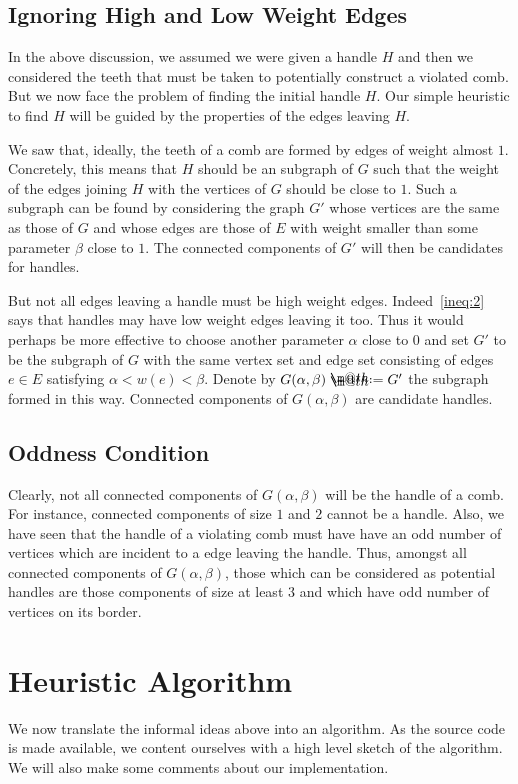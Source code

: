 \documentclass[12pt, letterpaper]{amsart}
\makeatletter
\theoremstyle{plain}
\theoremstyle{definition}
\theoremstyle{remark}
\newcommand*{\coloneqq}{\mathrel{\rlap{%
           \raisebox{0.3ex}{$\m@th\cdot$}}%
           \raisebox{-0.3ex}{$\m@th\cdot$}}%
           =}
\makeatother
\begin{document}
\subsection{Ignoring High and Low Weight Edges}
In the above discussion, we assumed we were given a handle $H$ and then we
considered the teeth that must be taken to potentially construct a violated
comb.  But we now face the problem of finding the initial handle $H$. Our
simple heuristic to find $H$ will be guided by the properties of the edges
leaving $H$.

We saw that, ideally, the teeth of a comb are formed by edges of weight almost
$1$. Concretely, this means that $H$ should be an subgraph of $G$ such
that the weight of the edges joining $H$ with the vertices of $G$ should be
close to $1$. Such a subgraph can be found by considering the graph $G'$ whose
vertices are the same as those of $G$ and whose edges are those of $E$ with
weight smaller than some parameter $\beta$ close to $1$. The connected
components of $G'$ will then be candidates for handles.

But not all edges leaving a handle must be high weight edges.
Indeed~\eqref{ineq:2} says that handles may have low weight edges leaving it
too. Thus it would perhaps be more effective to choose another parameter
$\alpha$ close to $0$ and set $G'$ to be the subgraph of $G$ with the same
vertex set and edge set consisting of edges $e \in E$ satisfying $\alpha < w(e)
< \beta$. Denote by $G(\alpha,\beta) \coloneqq G'$ the subgraph formed in this
way. Connected components of $G(\alpha,\beta)$ are candidate handles.

\subsection{Oddness Condition}
Clearly, not all connected components of $G(\alpha,\beta)$ will be the handle
of a comb. For instance, connected components of size $1$ and $2$ cannot be a
handle. Also, we have seen that the handle of a violating comb must have have
an odd number of vertices which are incident to a edge leaving the handle.
Thus, amongst all connected components of $G(\alpha,\beta)$, those which can be
considered as potential handles are those components of size at least $3$ and
which have odd number of vertices on its border.

\section{Heuristic Algorithm}\label{sec:algo}
We now translate the informal ideas above into an algorithm. As the source
code is made available, we content ourselves with a high level sketch of the
algorithm. We will also make some comments about our implementation.
\end{document}
